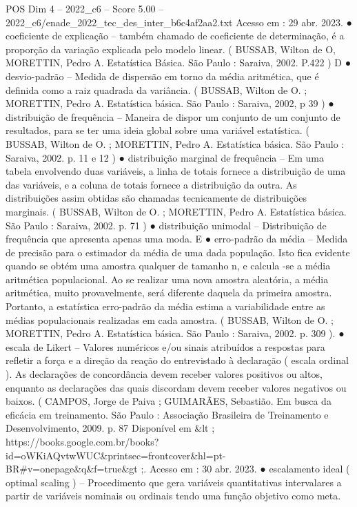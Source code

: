 \begin{textsample}{POS Dim 4 – 2022\_c6 – Score 5.00 – 2022\_c6/enade\_2022\_tec\_des\_inter\_b6c4af2aa2.txt}
Acesso em : 29 abr. 2023. {\EmojiFont ●} coeficiente de explicação – também chamado de coeficiente de determinação, é a proporção da variação explicada pelo modelo linear. ( BUSSAB, Wilton de O, MORETTIN, Pedro A.
Estatística Básica.
São Paulo : Saraiva, 2002.
P.422 ) D {\EmojiFont ●} desvio-padrão – Medida de dispersão em torno da média aritmética, que é definida como a raiz quadrada da variância. ( BUSSAB, Wilton de O. ; MORETTIN, Pedro A.
Estatística básica.
São Paulo : Saraiva, 2002, p 39 ) {\EmojiFont ●} distribuição de frequência – Maneira de dispor um conjunto de um conjunto de resultados, para se ter uma ideia global sobre uma variável estatística. ( BUSSAB, Wilton de O. ; MORETTIN, Pedro A.
Estatística básica.
São Paulo : Saraiva, 2002. p. 11 e 12 ) {\EmojiFont ●} distribuição marginal de frequência – Em uma tabela envolvendo duas variáveis, a linha de totais fornece a distribuição de uma das variáveis, e a coluna de totais fornece a distribuição da outra.
As distribuições assim obtidas são chamadas tecnicamente de distribuições marginais. ( BUSSAB, Wilton de O. ; MORETTIN, Pedro A.
Estatística básica.
São Paulo : Saraiva, 2002. p. 71 ) {\EmojiFont ●} distribuição unimodal – Distribuição de frequência que apresenta apenas uma moda.
E {\EmojiFont ●} erro-padrão da média – Medida de precisão para o estimador da média de uma dada população.
Isto fica evidente quando se obtém uma amostra qualquer de tamanho n, e calcula -se a média aritmética populacional.
Ao se realizar uma nova amostra aleatória, a média aritmética, muito provavelmente, será diferente daquela da primeira amostra.
Portanto, a estatística erro-padrão da média estima a variabilidade entre as médias populacionais realizadas em cada amostra. ( BUSSAB, Wilton de O. ; MORETTIN, Pedro A.
Estatística básica.
São Paulo : Saraiva, 2002. p. 309 ). {\EmojiFont ●} escala de Likert – Valores numéricos e/ou sinais atribuídos a respostas para refletir a força e a direção da reação do entrevistado à declaração ( escala ordinal ).
As declarações de concordância devem receber valores positivos ou altos, enquanto as declarações das quais discordam devem receber valores negativos ou baixos. ( CAMPOS, Jorge de Paiva ; GUIMARÃES, Sebastião.
Em busca da eficácia em treinamento.
São Paulo : Associação Brasileira de Treinamento e Desenvolvimento, 2009. p. 87 Disponível em \&lt ; https://books.google.com.br/books? id=oWKiAQvtwWUC\&printsec=frontcover\&hl=pt-BR\#v=onepage\&q\&f=true\&gt ;.
Acesso em : 30 abr. 2023. {\EmojiFont ●} escalamento ideal ( optimal scaling ) – Procedimento que gera variáveis quantitativas intervalares a partir de variáveis nominais ou ordinais tendo uma função objetivo como meta.

\end{textsample}
